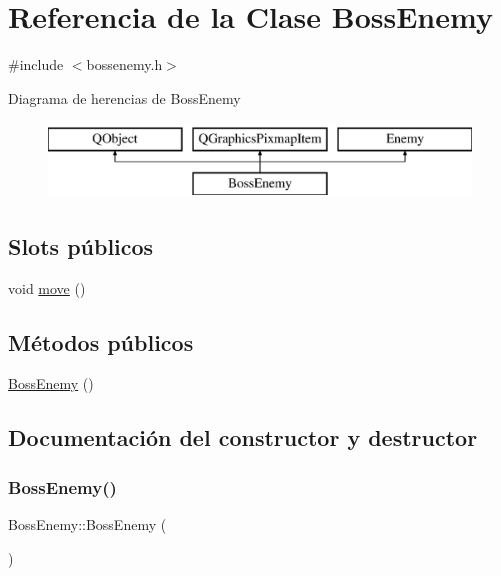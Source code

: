 \hypertarget{class_boss_enemy}{}\section{Referencia de la Clase Boss\+Enemy}
\label{class_boss_enemy}


{\ttfamily \#include $<$bossenemy.\+h$>$}

Diagrama de herencias de Boss\+Enemy\begin{figure}[H]
\begin{center}
\leavevmode
\includegraphics[height=2.000000cm]{class_boss_enemy}
\end{center}
\end{figure}
\subsection*{Slots públicos}
\begin{DoxyCompactItemize}
\item 
void \hyperlink{class_boss_enemy_a25a9f61fe3b4770b72a9dccb7685f2e9}{move} ()
\end{DoxyCompactItemize}
\subsection*{Métodos públicos}
\begin{DoxyCompactItemize}
\item 
\hyperlink{class_boss_enemy_a9240daf56362aa847067d5bad23c7a36}{Boss\+Enemy} ()
\end{DoxyCompactItemize}


\subsection{Documentación del constructor y destructor}
\hypertarget{class_boss_enemy_a9240daf56362aa847067d5bad23c7a36}{}\label{class_boss_enemy_a9240daf56362aa847067d5bad23c7a36} 
\subsubsection{\texorpdfstring{Boss\+Enemy()}{BossEnemy()}}
{\footnotesize\ttfamily Boss\+Enemy\+::\+Boss\+Enemy (\begin{DoxyParamCaption}{ }\end{DoxyParamCaption})}



